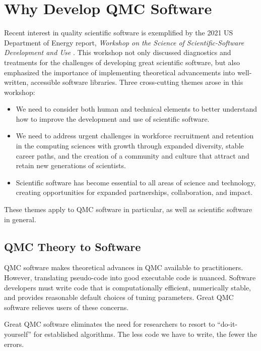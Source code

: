 \documentclass[graybox]{svmult}
\begin{document}
\section{Why Develop QMC Software} \label{CDHJS_sec:why_we_need_software}

Recent interest in quality scientific software is exemplified by the 2021 US Department of Energy report, \emph{Workshop on the Science of Scientific-Software Development and Use} \cite{ASCR-SSSDU, osti_1846008}. This workshop not only discussed diagnostics and treatments for the challenges of developing great scientific software, but also emphasized the importance of implementing theoretical advancements into well-written, accessible software libraries. Three cross-cutting themes arose in this workshop:
\begin{itemize}
    \item  We need to consider both human and technical elements to better understand how to improve the development and use of scientific software.

    \item We need to address urgent challenges in workforce recruitment and retention in the computing sciences with growth through expanded diversity, stable career paths, and the creation of a community and culture that attract and retain new generations of scientists.

    \item Scientific software has become essential to all areas of science and technology, creating opportunities for expanded partnerships, collaboration, and impact.
\end{itemize}
These themes apply to QMC software in particular, as well as scientific software in general.

\subsection{QMC Theory to Software}

QMC software makes theoretical advances in QMC available to practitioners. However, translating pseudo-code into good executable code is nuanced.  Software developers must write code that is computationally efficient, numerically stable, and provides reasonable default choices of tuning parameters. Great QMC software relieves users of these concerns.

Great QMC software eliminates the need for researchers to resort to  ``do-it-yourself'' for established algorithms.  The less code we have to write, the fewer the errors.
\end{document}
